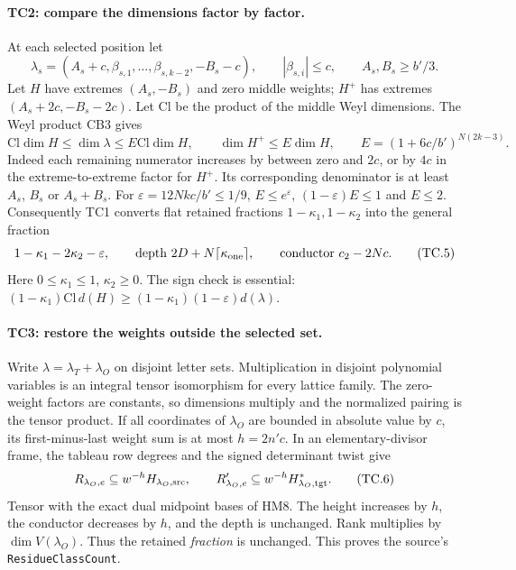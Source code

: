\paragraph{TC2: compare the dimensions factor by factor.}
At each selected position let
\[
 \lambda_s=(A_s+c,\beta_{s,1},\ldots,\beta_{s,k-2},-B_s-c),
 \qquad |\beta_{s,i}|\le c,\qquad A_s,B_s\ge b'/3.
\]
Let $H$ have extremes $(A_s,-B_s)$ and zero middle weights;
$H^+$ has extremes $(A_s+2c,-B_s-2c)$. Let $\mathrm{Cl}$ be
the product of the middle Weyl dimensions. The Weyl product CB3
gives
\[
 \mathrm{Cl}\dim H\le\dim\lambda\le E\mathrm{Cl}\dim H,
 \qquad \dim H^+\le E\dim H,\qquad
 E=(1+6c/b')^{N(2k-3)}.                                \tag{TC.4}
\]
Indeed each remaining numerator increases by between zero and
$2c$, or by $4c$ in the extreme-to-extreme factor for $H^+$.
Its corresponding denominator is at least $A_s$, $B_s$ or
$A_s+B_s$.
For $\varepsilon=12Nkc/b'\le1/9$,
$E\le e^\varepsilon$, $(1-\varepsilon)E\le1$ and $E\le2$.
Consequently TC1 converts flat retained fractions
$1-\kappa_1,1-\kappa_2$ into the general fraction
\[
 1-\kappa_1-2\kappa_2-\varepsilon,\qquad
 \hbox{depth }2D+N\lceil\kappa_{\rm one}\rceil,\qquad
 \hbox{conductor }c_2-2Nc.                             \tag{TC.5}
\]
Here $0\le\kappa_1\le1$, $\kappa_2\ge0$.
The sign check is essential:
$(1-\kappa_1)\mathrm{Cl}\,d(H)
\ge(1-\kappa_1)(1-\varepsilon)d(\lambda)$.

\paragraph{TC3: restore the weights outside the selected set.}
Write $\lambda=\lambda_T+\lambda_O$ on disjoint letter sets.
Multiplication in disjoint polynomial variables is an integral
tensor isomorphism for every lattice family. The zero-weight
factors are constants, so dimensions multiply and the normalized
pairing is the tensor product. If all coordinates of $\lambda_O$
are bounded in absolute value by $c$, its first-minus-last weight
sum is at most $h=2n'c$. In an elementary-divisor frame, the
tableau row degrees and the signed determinant twist give
\[
 R_{\lambda_O,e}\subseteq w^{-h}H_{\lambda_O,\rm src},
 \qquad R'_{\lambda_O,e}
       \subseteq w^{-h}H_{\lambda_O,\rm tgt}^{*}.        \tag{TC.6}
\]
Tensor with the exact dual midpoint bases of HM8. The height
increases by $h$, the conductor decreases by $h$, and the depth
is unchanged. Rank multiplies by $\dim V(\lambda_O)$.
Thus the retained \emph{fraction} is unchanged. This proves
the source's \texttt{ResidueClassCount}.

